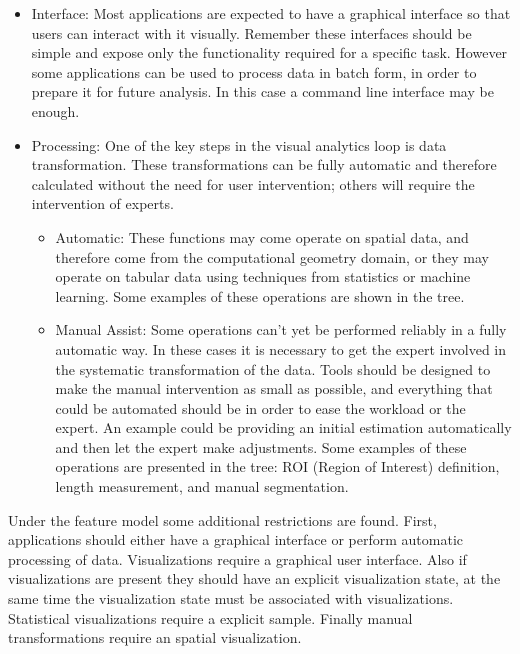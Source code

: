 \begin{itemize}
\begin{itemize}
\end{itemize}
\item Interface: Most applications are expected to have a graphical interface so that users can interact with it visually. Remember these interfaces should be simple and expose only the functionality required for a specific task. However some applications can be used to process data in batch form, in order to prepare it for future analysis. In this case a command line interface may be enough. 
\item Processing: One of the key steps in the visual analytics loop is data transformation. These transformations can be fully automatic and therefore calculated without the need for user intervention; others will require the intervention of experts.
\begin{itemize}
\item Automatic: These functions may come operate on spatial data, and therefore come from the computational geometry domain, or they may operate on tabular data using techniques from statistics or machine learning. Some examples of these operations are shown in the tree.
\item  Manual Assist: Some operations can't yet be performed reliably in a fully automatic way. In these cases it is necessary to get the expert involved in the systematic transformation of the data. Tools should be designed to make the manual intervention as small as possible, and everything that could be automated should be in order to ease the workload or the expert. An example could be providing an initial estimation automatically and then let the expert make adjustments. Some examples of these operations are presented in the tree: ROI (Region of Interest) definition, length measurement, and manual segmentation.

\end{itemize}

\end{itemize}

Under the feature model some additional restrictions are found. First, applications should either have a graphical interface or perform automatic processing of data. Visualizations require a graphical user interface. Also if visualizations are present they should have an explicit visualization state, at the same time the visualization state must be associated with visualizations. Statistical visualizations require a explicit sample. Finally manual transformations require an spatial visualization. 

